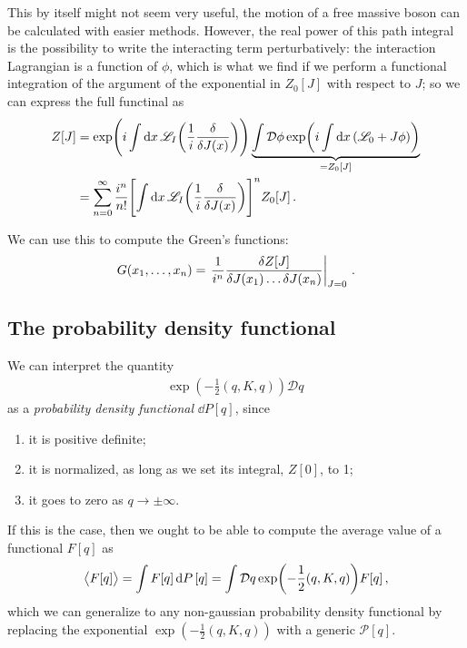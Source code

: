 \documentclass[main.tex]{subfiles}
\begin{document}
This by itself might not seem very useful, the motion of a free massive boson can be calculated with easier methods.
However, the real power of this path integral is the possibility to write the interacting term perturbatively: the interaction Lagrangian is a function of \(\phi \), which is what we find if we perform a functional integration of the argument of the exponential in \(Z_0 [J]\) with respect to \(J\); so we can express the full functinal as 
%
\begin{align}
Z[J] &= \exp( i\int \dd{x} \mathscr{L}_I\qty( \frac{1}{i} \fdv{}{J(x)}))
\underbrace{\int \mathcal{D} \phi \exp(i \int \dd{x} \qty( \mathscr{L}_0 + J \phi )) }_{= Z_0 [J]}  \\
&= \sum _{n=0}^{\infty } \frac{i^{n}}{n!} \qty[ \int \dd{x} \mathscr{L}_I\qty(\frac{1}{i} \fdv{}{J(x)})]^{n} Z_0 [J]
\,.
\end{align}

We can use this to compute the Green's functions: 
%
\begin{align}
G(x_1 , \dots , x_n) = \eval{\frac{1}{i^{n}} \frac{ \delta Z[J]}{ \delta J (x_1 ) \dots \delta J(x_n)}}_{J = 0}
\,.
\end{align}


\subsection{The probability density functional}

We can interpret the quantity 
%
\begin{align}
\exp(- \frac{1}{2} (q, K, q)) \mathcal{D}q
\,
\end{align}
%
as a \emph{probability density functional} \(\dd{P}[q]\), since 
\begin{enumerate}
    \item it is positive definite;
    \item it is normalized, as long as we set its integral, \(Z[0]\), to 1;
    \item it goes to zero as \(q \to \pm \infty \).
\end{enumerate}

If this is the case, then we ought to be able to compute the average value of a functional \(F[q]\) as 
%
\begin{align} \label{eq:average-of-a-functional}
\expval{F[q]} = \int F[q] \dd{P}[q] = \int \mathcal{D}q \exp(- \frac{1}{2} (q, K, q)) F[q]  
\,,
\end{align}
%
which we can generalize to any non-gaussian probability density functional by replacing the exponential \(\exp(- \frac{1}{2} (q, K, q))\) with a generic \(\mathcal{P}[q]\).
\end{document}
